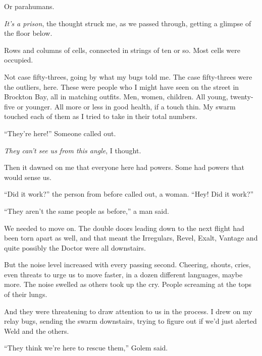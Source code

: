 Or parahumans.



\emph{It's a prison}, the thought struck me, as we passed through, getting a glimpse of the floor below.



Rows and columns of cells, connected in strings of ten or so.  Most cells were occupied.



Not case fifty-threes, going by what my bugs told me.  The case fifty-threes were the outliers, here.  These were people who I might have seen on the street in Brockton Bay, all in matching outfits.  Men, women, children.  All young, twenty-five or younger.  All more or less in good health, if a touch thin.  My swarm touched each of them as I tried to take in their total numbers.



``They're here!''  Someone called out.



\emph{They can't see us from this angle}, I thought.



Then it dawned on me that everyone here had powers.  Some had powers that would sense us.



``Did it work?'' the person from before called out, a woman.  ``Hey!  Did it work?''



``They aren't the same people as before,'' a man said.



We needed to move on.  The double doors leading down to the next flight had been torn apart as well, and that meant the Irregulars, Revel, Exalt, Vantage and quite possibly the Doctor were all downstairs.



But the noise level increased with every passing second.  Cheering, shouts, cries, even threats to urge us to move faster, in a dozen different languages, maybe more.  The noise swelled as others took up the cry.  People screaming at the tops of their lungs.



And they were threatening to draw attention to us in the process.  I drew on my relay bugs, sending the swarm downstairs, trying to figure out if we'd just alerted Weld and the others.



``They think we're here to rescue them,'' Golem said.



